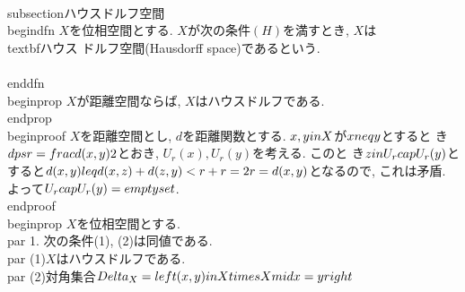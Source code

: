\\subsection{ハウスドルフ空間}
\\begin{dfn}
 $X$を位相空間とする. $X$が次の条件$(H)$を満すとき, $X$は\\textbf{ハウス
 ドルフ空間}(Hausdorff space)であるという.
 \\[
  (H):\\text{任意の}x, y\\in X\\text{に対し, }x\\neq y\\text{なら
 ば, }x\\text{の開近傍}U\\text{と}y\\text{の開近傍}V\\text{で, }U\\cap
 V=\\neq0\\text{を満すものが存在する.}
 \\]
\\end{dfn}
\\begin{prop}
 $X$が距離空間ならば, $X$はハウスドルフである.
\\end{prop}
\\begin{proof}
 $X$を距離空間とし, $d$を距離関数とする. $x, y\\in X$が$x\\neq y$とすると
 き$\\dps r=\\frac{d(x,y)}{2}$とおき, $U_{r}(x), U_{r}(y)$を考える. このと
 き$z\\in U_{r}\\cap U_{r}(y)$とすると$d(x, y)\\leq d(x, z)+d(z,
 y)<r+r=2r=d(x, y)$となるので, これは矛盾. よって$U_{r}\\cap
 U_{r}(y)=\\emptyset$.
\\end{proof}
\\begin{prop}
 $X$を位相空間とする.
 \\par 1. 次の条件(1), (2)は同値である.
 \\par (1)$X$はハウスドルフである.
 \\par (2)対角集合$\\Delta_{X}=\\left\\{(x, y)\\in X\\times X\\mid x=y\\right\\}$
